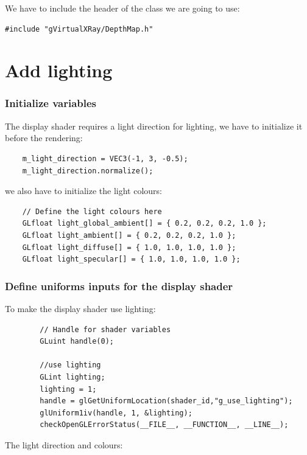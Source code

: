 \documentclass[12pt]{report}
\begin{document}
We have to include the header of the class we are going to use:
\begin{lstlisting}
#include "gVirtualXRay/DepthMap.h"
\end{lstlisting}

\chapter{Add lighting}

\subsection{Initialize variables}

The display shader requires a light direction for lighting, we have to initialize it before the rendering:

\begin{lstlisting}
	m_light_direction = VEC3(-1, 3, -0.5);
	m_light_direction.normalize();
\end{lstlisting}

we also have to initialize the light colours:

\begin{lstlisting}
 	// Define the light colours here
   	GLfloat light_global_ambient[] = { 0.2, 0.2, 0.2, 1.0 };
   	GLfloat light_ambient[] = { 0.2, 0.2, 0.2, 1.0 };
   	GLfloat light_diffuse[] = { 1.0, 1.0, 1.0, 1.0 };
   	GLfloat light_specular[] = { 1.0, 1.0, 1.0, 1.0 };
\end{lstlisting}

\subsection{Define uniforms inputs for the display shader}

To make the display shader use lighting: 

\begin{lstlisting}
        // Handle for shader variables
    	GLuint handle(0);

        //use lighting
        GLint lighting;
        lighting = 1;
        handle = glGetUniformLocation(shader_id,"g_use_lighting");
        glUniform1iv(handle, 1, &lighting);
        checkOpenGLErrorStatus(__FILE__, __FUNCTION__, __LINE__);
\end{lstlisting}

The light direction and colours:
\end{document}
